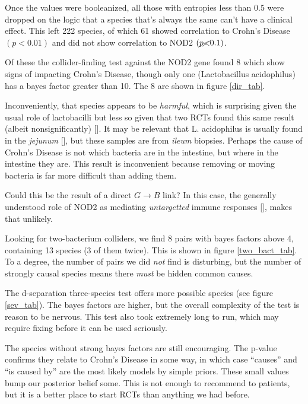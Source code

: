 \documentclass[letterpaper]{article}
\begin{document}
Once the values were booleanized, all those with
entropies less than 0.5 were dropped on the logic that a species
that's always the same can't have a clinical effect.  This left 222
species, of which 61 showed correlation to Crohn's Disease $(p<0.01)$
and did not show correlation to NOD2 $(p\cancel{<}0.1)$.

Of these the collider-finding test against the NOD2 gene found 8 which
show signs of impacting
Crohn's Disease, though only one (Lactobacillus acidophilus) has a
bayes factor greater than 10.  The 8 are shown in figure \ref{dir_tab}.

Inconveniently, that species appears to
be \textit{harmful}, which is surprising given the usual role of
lactobacilli but less so given that two RCTs found this same result
(albeit nonsignificantly) [\cite{lgg1,lgg2}].  It may be relevant that
L. acidophilus is usually found in the
\textit{jejunum} [\cite{lacid}], but these samples are from
\textit{ileum} biopsies.  Perhaps the cause of Crohn's Disease is not
which bacteria are in the intestine, but where in the intestine they
are.  This result is inconvenient because removing or moving bacteria
is far more difficult than adding them.

Could this be the result of a direct $G\rightarrow B$ link?  In this
case, the generally
understood role of NOD2 as mediating \textit{untargetted} immune
responses [\cite{nod2}], makes that unlikely.

Looking for two-bacterium colliders, we find 8 pairs with bayes
factors above 4, containing 13 species (3 of them twice).  This is
shown in figure \ref{two_bact_tab}.  To a degree, the number of pairs
we did \textit{not} find is disturbing, but the number of strongly
causal species means there \textit{must} be hidden common causes.

The d-separation three-species test offers more possible species (see figure
\ref{sev_tab}).  The bayes factors are higher, but the overall
complexity of the test is reason to be nervous.  This test also took
extremely long to run, which may require fixing before it can be used
seriously.

The species without strong bayes factors are still encouraging.  The
p-value confirms they relate to Crohn's Disease in some way, in which
case ``causes'' and ``is caused by'' are the most likely models by
simple priors.  These small values bump our posterior belief some.
This is not enough to recommend to patients, but it is a better place
to start RCTs than anything we had before.

\printbibliography
\end{document}
